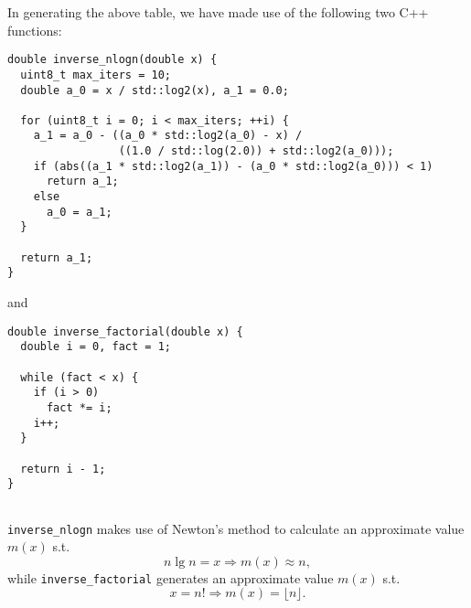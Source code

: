 \qquad In generating the above table, we have made use of the following two C++ functions:
\begin{verbatim}
double inverse_nlogn(double x) {
  uint8_t max_iters = 10;
  double a_0 = x / std::log2(x), a_1 = 0.0;

  for (uint8_t i = 0; i < max_iters; ++i) {
    a_1 = a_0 - ((a_0 * std::log2(a_0) - x) /
                 ((1.0 / std::log(2.0)) + std::log2(a_0)));
    if (abs((a_1 * std::log2(a_1)) - (a_0 * std::log2(a_0))) < 1)
      return a_1;
    else
      a_0 = a_1;
  }

  return a_1;
}
\end{verbatim}
and 
\begin{verbatim}
double inverse_factorial(double x) {
  double i = 0, fact = 1;

  while (fact < x) {
    if (i > 0)
      fact *= i;
    i++;
  }

  return i - 1;
}
    
\end{verbatim}
\texttt{inverse\_nlogn} makes use of Newton's method to calculate an approximate 
value $m(x)$ s.t. 
\[
    n\lg{n} = x \Rightarrow m(x) \approx n, 
\]
while \texttt{inverse\_factorial} generates an approximate value $m(x)$ s.t. 
\[
    x = n! \Rightarrow m(x) = \lfloor n \rfloor. 
\]
